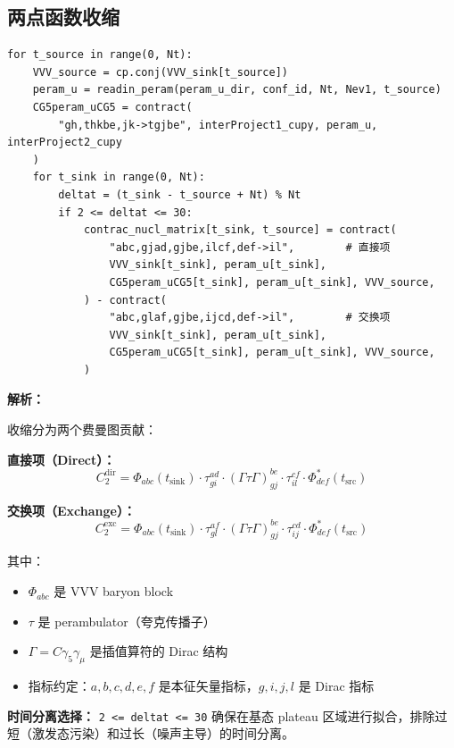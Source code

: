 \documentclass[12pt,a4paper]{ctexart}
\begin{document}
\subsection{两点函数收缩}

\begin{lstlisting}[caption={质子两点函数收缩}]
for t_source in range(0, Nt):
    VVV_source = cp.conj(VVV_sink[t_source])
    peram_u = readin_peram(peram_u_dir, conf_id, Nt, Nev1, t_source)
    CG5peram_uCG5 = contract(
        "gh,thkbe,jk->tgjbe", interProject1_cupy, peram_u, interProject2_cupy
    )
    for t_sink in range(0, Nt):
        deltat = (t_sink - t_source + Nt) % Nt
        if 2 <= deltat <= 30:
            contrac_nucl_matrix[t_sink, t_source] = contract(
                "abc,gjad,gjbe,ilcf,def->il",        # 直接项
                VVV_sink[t_sink], peram_u[t_sink],
                CG5peram_uCG5[t_sink], peram_u[t_sink], VVV_source,
            ) - contract(
                "abc,glaf,gjbe,ijcd,def->il",        # 交换项
                VVV_sink[t_sink], peram_u[t_sink],
                CG5peram_uCG5[t_sink], peram_u[t_sink], VVV_source,
            )
\end{lstlisting}

\textbf{解析：}

收缩分为两个费曼图贡献：

\textbf{直接项（Direct）：}
\begin{equation}
C_2^{\text{dir}} = \Phi_{abc}(t_{\text{sink}}) \cdot \tau_{gi}^{ad} \cdot (\Gamma\tau\Gamma)_{gj}^{be} \cdot \tau_{il}^{cf} \cdot \Phi_{def}^*(t_{\text{src}})
\end{equation}

\textbf{交换项（Exchange）：}
\begin{equation}
C_2^{\text{exc}} = \Phi_{abc}(t_{\text{sink}}) \cdot \tau_{gl}^{af} \cdot (\Gamma\tau\Gamma)_{gj}^{be} \cdot \tau_{ij}^{cd} \cdot \Phi_{def}^*(t_{\text{src}})
\end{equation}

其中：
\begin{itemize}
    \item $\Phi_{abc}$ 是 VVV baryon block
    \item $\tau$ 是 perambulator（夸克传播子）
    \item $\Gamma = C\gamma_5\gamma_\mu$ 是插值算符的 Dirac 结构
    \item 指标约定：$a,b,c,d,e,f$ 是本征矢量指标，$g,i,j,l$ 是 Dirac 指标
\end{itemize}

\textbf{时间分离选择：} \texttt{2 <= deltat <= 30} 确保在基态 plateau 区域进行拟合，排除过短（激发态污染）和过长（噪声主导）的时间分离。
\end{document}
